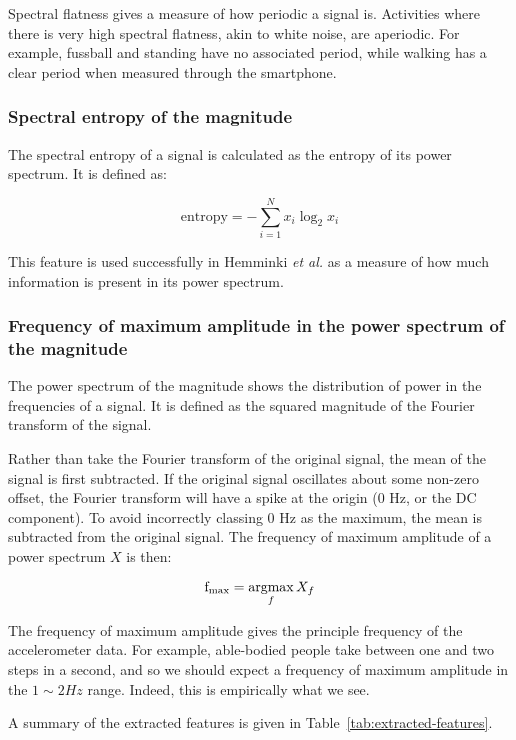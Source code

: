         Spectral flatness gives a measure of how periodic a signal is. Activities where there is very high spectral flatness, akin to white noise, are aperiodic. For example, fussball and standing have no associated period, while walking has a clear period when measured through the smartphone.
      \subsubsection{Spectral entropy of the magnitude}
        The spectral entropy of a signal is calculated as the entropy of its power spectrum. It is defined as:

        $$\mathrm{entropy} = -\sum\limits_{i=1}^N x_i \log_2 x_i$$
        
        This feature is used successfully in Hemminki \emph{et al.}\cite{hemminki2013accelerometer} as a measure of how much information is present in its power spectrum.
        
      \subsubsection{Frequency of maximum amplitude in the power spectrum of the magnitude}
        The power spectrum of the magnitude shows the distribution of power in the frequencies of a signal. It is defined as the squared magnitude of the Fourier transform of the signal.
        
        Rather than take the Fourier transform of the original signal, the mean of the signal is first subtracted. If the original signal oscillates about some non-zero offset, the Fourier transform will have a spike at the origin (0 \si{Hz}, or the DC component). To avoid incorrectly classing 0 \si{Hz} as the maximum, the mean is subtracted from the original signal. The frequency of maximum amplitude of a power spectrum $X$ is then:
        
        $$\mathrm{f}_\mathrm{max} = \operatorname*{argmax}_f X_f$$
        
        The frequency of maximum amplitude gives the principle frequency of the accelerometer data. For example, able-bodied people take between one and two steps in a second, and so we should expect a frequency of maximum amplitude in the $1 \sim 2 \si{Hz}$ range. Indeed, this is empirically what we see.
        
        A summary of the extracted features is given in Table~\ref{tab:extracted-features}.

